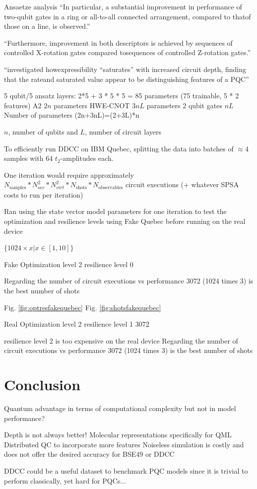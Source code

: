 \documentclass[journal=jacsat,manuscript=article]{achemso}
\begin{document}
Ansaetze analysis \cite{sim_expressibility_2019}
``In particular, a substantial improvement in performance of two-qubit gates in a ring or all-to-all connected arrangement, compared to thatof those on a line, is observed.''

``Furthermore, improvement in both descriptors is achieved by sequences of controlled X-rotation gates compared tosequences of controlled Z-rotation gates.''

``investigated howexpressibility “saturates” with increased circuit depth, finding that the rateand saturated value appear to be distinguishing features of a PQC''



5 qubit/5 ansatz layers: 2*5 + 3 * 5 * 5 = 85 parameters (75 trainable, 5 * 2 features)
A2 $2n$ parameters
HWE-CNOT $3nL$ parameters
2 qubit gates $nL$
Number of parameters (2n+3nL)=(2+3L)*n

$n$, number of qubits and $L$, number of circuit layers

To efficiently run DDCC on IBM Quebec, splitting the data into batches of $\approx 4$ samples with 64 $t_{2}$-amplitudes each.

One iteration would require approximately $N_{\text{samples}} * N_{occ}^{2} * N_{virt}^{2} * N_{\text{shots}} * N_{\text{observables}}$ circuit executions (+ whatever SPSA costs to run per iteration)


Ran using the state vector model parameters for one iteration to test the optimization and resilience levels using Fake Quebec before running on the real device

$\{1024 \times x \vert  x \in [1,10]\}$ 

Fake
Optimization level 2 
resilience level 0

Regarding the number of circuit executions vs performance 3072 (1024 times 3) is the best number of shots


Fig. \ref{fig:optresfakequebec}
Fig. \ref{fig:shotsfakequebec}


Real
Optimization level 2 
resilience level 1
3072

resilience level 2 is too expensive on the real device
Regarding the number of circuit executions vs performance 3072 (1024 times 3) is the best number of shots


\section{Conclusion}
Quantum advantage in terms of computational complexity but not in model performance?


Depth is not always better!
Molecular representations specifically for QML
Distributed QC to incorporate more features
Noiseless simulation is costly and does not offer the desired accuracy for BSE49 or DDCC

DDCC could be a useful dataset to benchmark PQC models since it is trivial to perform classically, yet hard for PQCs...


\end{document}
